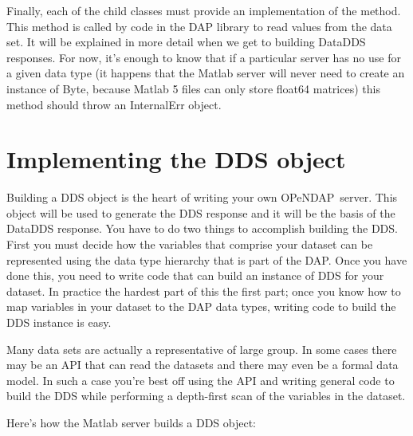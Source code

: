 \documentclass{dods-paper}
\newcommand{\opendap}{OPeNDAP}
\begin{document}
Finally, each of the child classes must provide an implementation of the
 method. This method is called by code in the DAP library to read
values from the data set. It will be explained in more detail when we get to
building DataDDS responses. For now, it's enough to know that if a particular
server has no use for a given data type (it happens that the Matlab server
will never need to create an instance of Byte, because Matlab 5 files can
only store float64 matrices) this method should throw an InternalErr object.

\section{Implementing the DDS object}
\label{server-tut,implementing}

Building a DDS object is the heart of writing your own \opendap\ server. This
object will be used to generate the DDS response and it will be the basis of
the DataDDS response. You have to do two things to accomplish building the DDS.
First you must decide how the variables that comprise your dataset can be
represented using the data type hierarchy that is part of the DAP. Once you
have done this, you need to write code that can build an instance of DDS for
your dataset. In practice the hardest part of this the first part; once you
know how to map variables in your dataset to the DAP data types, writing code
to build the DDS instance is easy.

Many data sets are actually a representative of large group. In some cases
there may be an API that can read the datasets and there may even be a
formal data model. In such a case you're best off using the API and
writing general code to build the DDS while performing a depth-first
scan of the variables in the dataset.
 

Here's how the Matlab server builds a DDS object:
\end{document}

